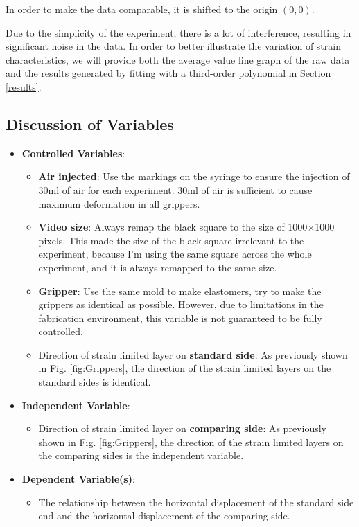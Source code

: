 \documentclass[conference]{IEEEtran}
\begin{document}
In order to make the data comparable, it is shifted to the origin $(0,0)$.

Due to the simplicity of the experiment, there is a lot of interference, resulting in significant noise in the data. In order to better illustrate the variation of strain characteristics, we will provide both the average value line graph of the raw data and the results generated by fitting with a third-order polynomial in Section \ref{results}.


\subsection{Discussion of Variables}

\begin{itemize}
    \item \textbf{Controlled Variables}: %
    \begin{itemize}
        \item \textbf{Air injected}: Use the markings on the syringe to ensure the injection of 30ml of air for each experiment. 30ml of air is sufficient to cause maximum deformation in all grippers.
        \item \textbf{Video size}: Always remap the black square to the size of 1000$\times$1000 pixels. This made the size of the black square irrelevant to the experiment, because I'm using the same square across the whole experiment, and it is always remapped to the same size.
        \item \textbf{Gripper}: Use the same mold to make elastomers, try to make the grippers as identical as possible. However, due to limitations in the fabrication environment, this variable is not guaranteed to be fully controlled.
        \item Direction of strain limited layer on \textbf{standard side}:  As previously shown in Fig. \ref{fig:Grippers}, the direction of the strain limited layers on the standard sides is identical.
    \end{itemize}
    \item \textbf{Independent Variable}: 
        \begin{itemize}
            \item Direction of strain limited layer on \textbf{comparing side}: As previously shown in Fig. \ref{fig:Grippers}, the direction of the strain limited layers on the comparing sides is the independent variable. 
        \end{itemize}
    \item \textbf{Dependent Variable(s)}: 
         \begin{itemize}
             \item The relationship between the horizontal displacement of the standard side end and the horizontal displacement of the comparing side.
         \end{itemize}
\end{itemize}
\end{document}
